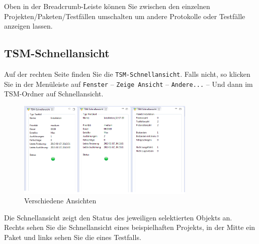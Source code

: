 \documentclass[11pt,a4paper,titlepage]{article}
\begin{document}
Oben in der Breadcrumb-Leiste können Sie zwischen den einzelnen Projekten/Paketen/Testfällen umschalten um andere Protokolle oder Testfälle anzeigen lassen.

\subsection{TSM-Schnellansicht}
Auf der rechten Seite finden Sie die \texttt{TSM-Schnellansicht}.
Falls nicht, so klicken Sie in der Menüleiste auf \texttt{Fenster} -- \texttt{Zeige Ansicht} -- \texttt{Andere...} -- Und dann im TSM-Ordner auf Schnellansicht.

\begin{figure}[H]
\centering
\includegraphics[width= 320px]{BilderHandbuch/Quickview/Quickview.png}
\caption{Verschiedene Ansichten}
\label{fig:Breadcrumb}
\end{figure}

Die Schnellansicht zeigt den Status des jeweiligen selektierten Objekts an.\\
Rechts sehen Sie die Schnellansicht eines beispielhaften Projekts, in der Mitte ein Paket und links sehen Sie die eines Testfalls.

\newpage
\end{document}
